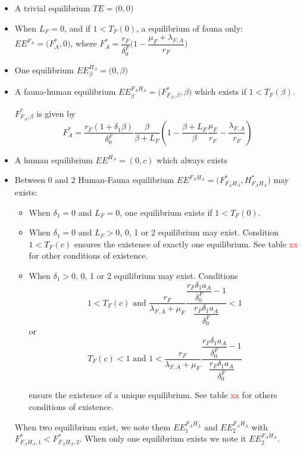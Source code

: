 \documentclass{article}
\newcommand{\lfa}{\lambda_{F, A}}
\newcommand{\df}{\delta_0^F}
\newcommand{\marc}[1]{\textcolor{red}{#1}}
\begin{document}
\begin{itemize}
\item A trivial equilibrium $TE = \big(0,0 \big)$
\item When $L_F = 0$, and if $1 < T_F(0)$, a equilibrium of fauna only: $EE^{F_A} = \Big(F_A^*, 0\Big)$, where $F_A^* = \dfrac{r_F}{\df}\Big(1 - \dfrac{\mu_F + \lfa}{r_F}\Big)$
\item One equilibrium $EE^{H_A}_\beta = \Big(0, \beta\Big)$
\item A fauna-human equilibrium $EE^{F_AH_A}_\beta = \Big(F^*_{F_A, \beta}, \beta\Big)$ which exists if $1 < T_F(\beta)$.

$F^*_{F_A, \beta}$ is given by
\begin{equation*}
F_A^* = \dfrac{r_F(1+\delta_1 \beta)}{\df}\dfrac{\beta}{\beta + L_F}\left(1 - \dfrac{\beta + L_F}{\beta}\dfrac{\mu_F}{r_F} - \dfrac{\lfa}{r_F}\right)
\end{equation*}

\item A human equilibrium $EE^{H_A} = (0, c)$ which always exists
\item Between 0 and 2 Human-Fauna equilibrium $EE^{F_AH_A} = \Big(F^*_{F_AH_A}, H^*_{F_AH_A} \Big)$ may exists:

\begin{itemize}
\item When $\delta_1 = 0$ and $L_F = 0$, one equilibrium exists if $1 < T_F(0)$. 
\item When $\delta_1 = 0$ and $L_F > 0$, 0, 1 or 2 equilibrium may exist. Condition $1 < T_F(c)$ ensures the existence of exactly one equilibrium. See table \marc{xx} for other conditions of existence.
\item When $\delta_1 > 0$, 0, 1 or 2 equilibrium may exist. Conditions
$$1 < T_F(c) \text{ and  } \dfrac{r_F}{\lfa + \mu_F} \dfrac{\dfrac{r_F \delta_1 a_A}{\df} - 1}{\dfrac{r_F \delta_1 a_A}{\df}} < 1$$
or
$$
T_F(c) < 1 \text{ and  } 1 < \dfrac{r_F}{\lfa + \mu_F} \dfrac{\dfrac{r_F \delta_1 a_A}{\df} - 1}{\dfrac{r_F \delta_1 a_A}{\df}}
$$

ensure the existence of a unique equilibrium. See table \marc{xx} for others conditions of existence.
\end{itemize}

When two equilibrium exist, we note them $EE^{F_AH_A}_1$ and $EE^{F_AH_A}_2$ with $F^*_{F_AH_A,1} < F^*_{F_AH_A,2}$. When only one equilibrium exists we note it $EE^{F_AH_A}_2$.

\end{itemize}
\end{document}
